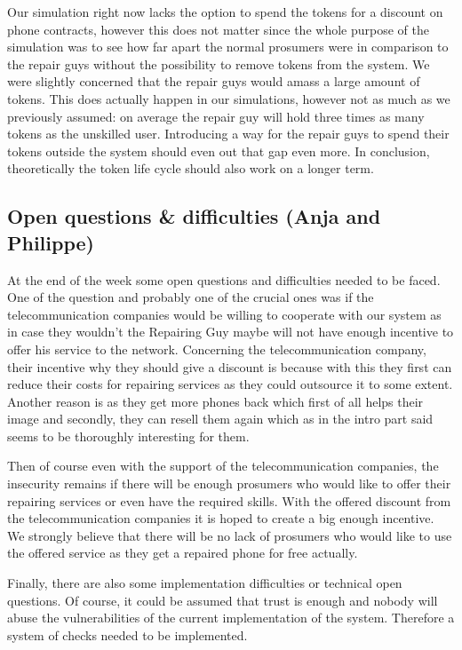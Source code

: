 \documentclass[11pt]{scrartcl}
\begin{document}
Our simulation right now lacks the option to spend the tokens for a discount on phone contracts, however this does not matter since the whole purpose of the simulation was to see how far apart the normal prosumers were in comparison to the repair guys without the possibility to remove tokens from the system. We were slightly concerned that the repair guys would amass a large amount of tokens. This does actually happen in our simulations, however not as much as we previously assumed: on average the repair guy will hold three times as many tokens as the unskilled user. Introducing a way for the repair guys to spend their tokens outside the system should even out that gap even more. In conclusion, theoretically the token life cycle should also work on a longer term.

\subsection{Open questions \& difficulties (Anja and Philippe)}
At the end of the week some open questions and difficulties needed to be faced.  One of the question and probably one of the crucial ones was if the telecommunication companies would be willing to cooperate  with our system as in case they wouldn't the Repairing Guy maybe will not have enough incentive to offer his service to the network. Concerning the telecommunication company, their incentive why they should give a discount is because with this they first can reduce their costs for repairing services as they could outsource it to some extent. Another reason is as they get more phones back which first of all helps their image and secondly, they can resell them again which as in the intro part said seems to be thoroughly interesting for them.

Then of course even with the support of the telecommunication companies, the insecurity remains if there will be enough prosumers who would like to offer their repairing services or even have the required skills. With the offered discount from the telecommunication companies it is hoped to create a big enough incentive. We strongly believe that there will be no lack of prosumers who would like to use the offered service as they get a repaired phone for free actually.

Finally, there are also some implementation difficulties or technical open questions. Of course, it could be assumed that trust is enough and nobody will abuse the vulnerabilities of the current implementation of the system. Therefore a system of checks needed to be implemented.
\end{document}
